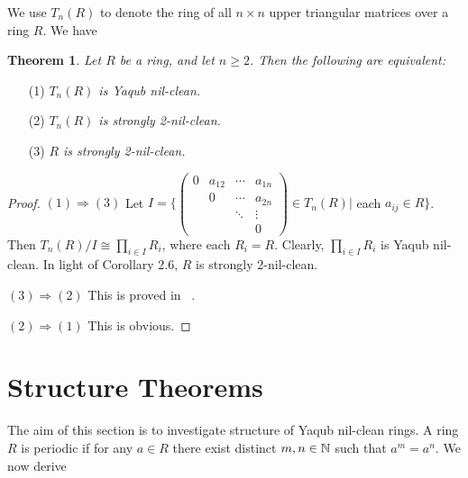 \documentclass[12pt, reqno]{amsart}
\newtheorem{thm}{Theorem}[section]
\numberwithin{equation}{section}
\begin{document}
We use $T_n(R)$ to denote the ring of all $n\times n$ upper triangular matrices over a ring $R$. We have

\begin{thm} Let $R$ be a ring, and let $n\geq 2$. Then the following are equivalent:
\end{thm}
\begin{enumerate}
\item [(1)] {\it $T_n(R)$ is Yaqub nil-clean.}
\vspace{-.5mm}
\item [(2)] {\it $T_n(R)$ is strongly 2-nil-clean.}
\vspace{-.5mm}
\item [(3)] {\it $R$ is strongly 2-nil-clean.}
\end{enumerate}
\begin{proof} $(1)\Rightarrow (3)$ Let $I=\{
\left(
\begin{array}{cccc}
0&a_{12}&\cdots&a_{1n}\\
&0&\cdots &a_{2n}\\
&&\ddots&\vdots\\
&&&0
\end{array}
\right)\in T_n(R) | $ each $a_{ij}\in R\}$. Then $T_n(R)/I\cong \prod\limits_{i\in I}R_{i}$, where each $R_i=R$. Clearly,
$\prod\limits_{i\in I}R_{i}$ is Yaqub nil-clean. In light of Corollary 2.6, $R$ is strongly 2-nil-clean.

$(3)\Rightarrow (2)$ This is proved in ~\cite[Corollary 2.6]{CS}.

$(2)\Rightarrow (1)$ This is obvious.\end{proof}

\section{Structure Theorems}

\vskip4mm The aim of this section is to investigate structure of Yaqub nil-clean rings. A ring $R$ is periodic if for any $a\in R$ there exist distinct $m,n\in {\Bbb N}$ such that $a^m=a^n$. We now derive
\end{document}
